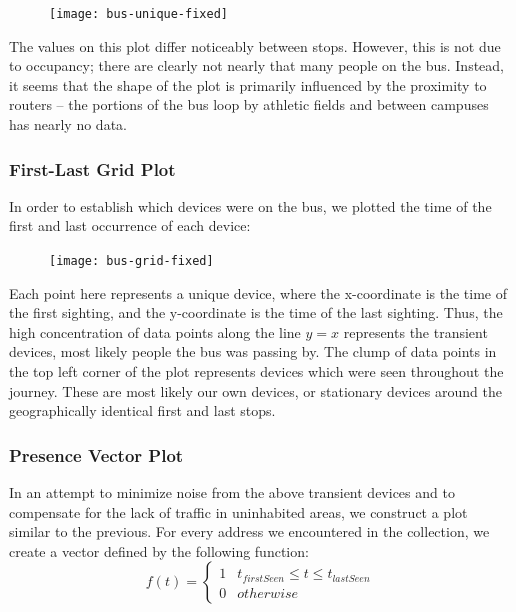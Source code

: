 \documentclass[11pt,journal,compsoc]{IEEEtran} %
\begin{document}
		\begin{figure}[!t]
		\texttt{[image: bus-unique-fixed]}
		\end{figure}

		The values on this plot differ noticeably between stops.
		However, this is not due to occupancy; there are clearly not nearly that many people on the bus.
		Instead, it seems that the shape of the plot is primarily influenced by the proximity to routers -- the portions of the bus loop by athletic fields and between campuses has nearly no data.

	\subsubsection*{First-Last Grid Plot}
		In order to establish which devices were on the bus, we plotted the time of the first and last occurrence of each device:

		\begin{figure}[H]
		\texttt{[image: bus-grid-fixed]}
		\end{figure}

		Each point here represents a unique device, where the x-coordinate is the time of the first sighting, and the y-coordinate is the time of the last sighting.
		Thus, the high concentration of data points along the line \(y=x\) represents the transient devices, most likely people the bus was passing by.
		The clump of data points in the top left corner of the plot represents devices which were seen throughout the journey.
		These are most likely our own devices, or stationary devices around the geographically identical first and last stops.

	\subsubsection*{Presence Vector Plot}
		In an attempt to minimize noise from the above transient devices and to compensate for the lack of traffic in uninhabited areas, we construct a plot similar to the previous. %
		For every address we encountered in the collection, we create a vector defined by the following function:
		\begin{equation*}
		f(t) = \begin{cases}
			1 & t_{firstSeen} \le t \le t_{lastSeen}\\
			0 & otherwise
		\end{cases}
		\end{equation*}
\end{document}
